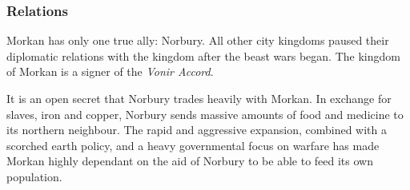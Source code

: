 \subsubsection{Relations}

Morkan has only one true ally: Norbury. All other city kingdoms paused their
diplomatic relations with the kingdom after the beast wars began.  The kingdom
of Morkan is a signer of the \emph{Vonir Accord}.

It is an open secret that Norbury trades heavily with Morkan. In exchange for
slaves, iron and copper, Norbury sends massive amounts of food and medicine to
its northern neighbour. The rapid and aggressive expansion, combined with a
scorched earth policy, and a heavy governmental focus on warfare has made
Morkan highly dependant on the aid of Norbury to be able to feed its own
population.
